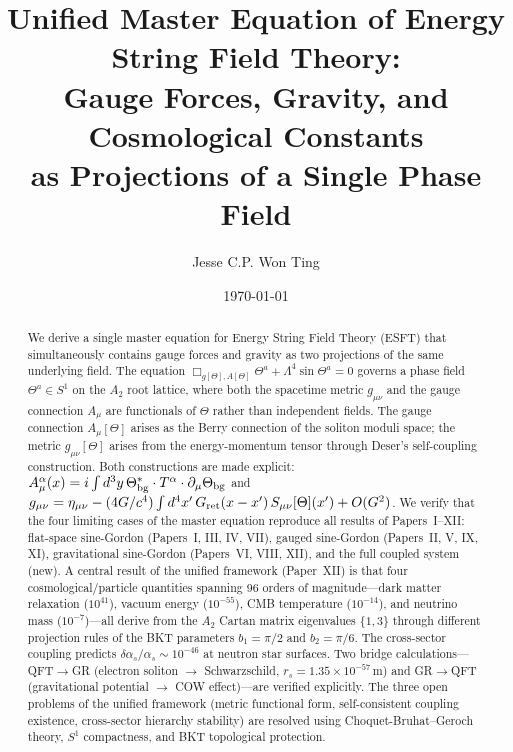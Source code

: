 \documentclass[twocolumn,preprintnumbers,amsmath,amssymb,prd]{revtex4-2}
\begin{document}
\title{Unified Master Equation of Energy String Field Theory:\\Gauge Forces, Gravity, and Cosmological Constants\\as Projections of a Single Phase Field}

\author{Jesse C.P. Won Ting}

\date{\today}

\begin{abstract}
We derive a single master equation for Energy String Field Theory (ESFT) that simultaneously contains gauge forces and gravity as two projections of the same underlying field.
The equation $\Box_{g[\Theta],A[\Theta]}\Theta^a + \Lambda^4\sin\Theta^a = 0$ governs a phase field $\Theta^a \in S^1$ on the $A_2$ root lattice, where both the spacetime metric $g_{\mu\nu}$ and the gauge connection $A_\mu$ are functionals of $\Theta$ rather than independent fields.
The gauge connection $A_\mu[\Theta]$ arises as the Berry connection of the soliton moduli space; the metric $g_{\mu\nu}[\Theta]$ arises from the energy-momentum tensor through Deser's self-coupling construction.
Both constructions are made explicit: $A_\mu^\alpha(x) = i\int d^3y\,\Theta^*_{\rm bg}\cdot T^\alpha\cdot\partial_\mu\Theta_{\rm bg}$ and $g_{\mu\nu} = \eta_{\mu\nu} - (4G/c^4)\int d^4x'\,G_{\rm ret}(x-x')\,S_{\mu\nu}[\Theta](x') + O(G^2)$.
We verify that the four limiting cases of the master equation reproduce all results of Papers~I--XII: flat-space sine-Gordon (Papers~I, III, IV, VII), gauged sine-Gordon (Papers~II, V, IX, XI), gravitational sine-Gordon (Papers~VI, VIII, XII), and the full coupled system (new).
A central result of the unified framework (Paper~XII) is that four cosmological/particle quantities spanning 96 orders of magnitude---dark matter relaxation ($10^{41}$), vacuum energy ($10^{-55}$), CMB temperature ($10^{-14}$), and neutrino mass ($10^{-7}$)---all derive from the $A_2$ Cartan matrix eigenvalues $\{1,3\}$ through different projection rules of the BKT parameters $b_1 = \pi/2$ and $b_2 = \pi/6$.
The cross-sector coupling predicts $\delta\alpha_s/\alpha_s \sim 10^{-46}$ at neutron star surfaces.
Two bridge calculations---QFT$\to$GR (electron soliton $\to$ Schwarzschild, $r_s = 1.35\times10^{-57}\,$m) and GR$\to$QFT (gravitational potential $\to$ COW effect)---are verified explicitly.
The three open problems of the unified framework (metric functional form, self-consistent coupling existence, cross-sector hierarchy stability) are resolved using Choquet-Bruhat--Geroch theory, $S^1$ compactness, and BKT topological protection.
\end{abstract}
\end{document}
